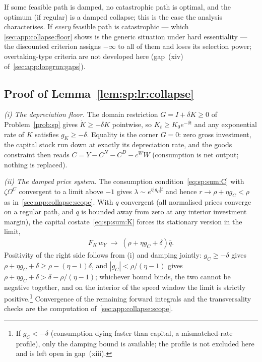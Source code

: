  If some feasible path is damped, no catastrophic path is optimal, and the
optimum (if regular) is a damped collapse; this is the case the analysis characterises. If
\emph{every} feasible path is catastrophic --- which
\ref{sec:app:collapse:floor} shows is the generic situation under hard essentiality --- the
discounted criterion assigns $-\infty$ to all of them and loses its selection power;
overtaking-type criteria are not developed here (gap~(xiv) of~\ref{sec:app:longrun:gaps}).

\subsection{Proof of Lemma~\ref{lem:sp:lr:collapse}}\label{sec:app:collapse:lemma}

\emph{(i) The depreciation floor.} The domain restriction $G=I+\delta K\ge0$ of
Problem~\ref{prob:sp} gives $\dot K\ge-\delta K$ pointwise, so $K_t\ge K_0e^{-\delta t}$ and
any exponential rate of $K$ satisfies $g_K\ge-\delta$. Equality is the corner $G=0$: zero
gross investment, the capital stock run down at exactly its depreciation rate, and the goods
constraint then reads $C=Y-C^N-C^D-c^WW$ (consumption is net output; nothing is replaced).

\emph{(ii) The damped price system.} The consumption condition~\eqref{eq:sp:sum:C} with
$\zeta\Omega^C$ convergent to a limit above $-1$ gives $\lambda\sim e^{\eta\left|g_C\right|t}$
and hence $r\to\rho+\eta g_C<\rho$ as in~\ref{sec:app:collapse:scope}. With $q$ convergent
(all normalised prices converge on a regular path, and $q$ is bounded away from zero at any
interior investment margin), the capital costate~\eqref{eq:sp:sum:K} forces its stationary
version in the limit,
\begin{align}
F_K\,w_Y\;\to\;\left(\rho+\eta g_C+\delta\right)\bar q .
\label{eq:app:col:FK}
\end{align}
Positivity of the right side follows from (i) and damping jointly: $g_C\ge-\delta$ gives
$\rho+\eta g_C+\delta\ge\rho-\left(\eta-1\right)\delta$, and
$\left|g_C\right|<\rho/\left(\eta-1\right)$ gives
$\rho+\eta g_C+\delta>\delta-\rho/\left(\eta-1\right)$; whichever bound binds, the two
cannot be negative together, and on the interior of the speed window the limit is strictly
positive.\footnote{If $g_C<-\delta$ (consumption dying faster than capital, a mismatched-rate
profile), only the damping bound is available; the profile is not excluded here and is left
open in gap~(xiii).} Convergence of the remaining forward integrals and the transversality
checks are the computation of~\ref{sec:app:collapse:scope}.

